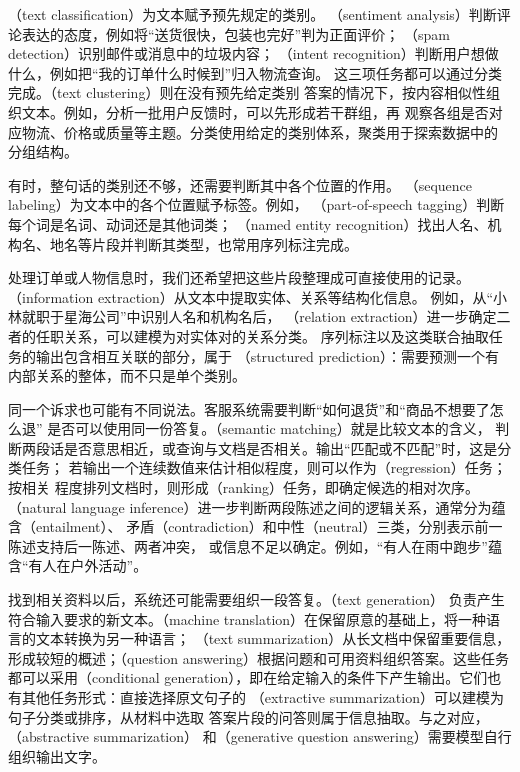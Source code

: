（text classification）为文本赋予预先规定的类别。
（sentiment analysis）判断评论表达的态度，例如将“送货很快，包装也完好”判为正面评价；
（spam detection）识别邮件或消息中的垃圾内容；
（intent recognition）判断用户想做什么，例如把“我的订单什么时候到”归入物流查询。
这三项任务都可以通过分类完成。（text clustering）则在没有预先给定类别
答案的情况下，按内容相似性组织文本。例如，分析一批用户反馈时，可以先形成若干群组，再
观察各组是否对应物流、价格或质量等主题。分类使用给定的类别体系，聚类用于探索数据中的
分组结构。

有时，整句话的类别还不够，还需要判断其中各个位置的作用。
（sequence labeling）为文本中的各个位置赋予标签。例如，
（part-of-speech tagging）判断每个词是名词、动词还是其他词类；
（named entity recognition）找出人名、机构名、地名等片段并判断其类型，也常用序列标注完成。

处理订单或人物信息时，我们还希望把这些片段整理成可直接使用的记录。
（information extraction）从文本中提取实体、关系等结构化信息。
例如，从“小林就职于星海公司”中识别人名和机构名后，
（relation extraction）进一步确定二者的任职关系，可以建模为对实体对的关系分类。
序列标注以及这类联合抽取任务的输出包含相互关联的部分，属于
（structured prediction）：需要预测一个有内部关系的整体，而不只是单个类别。

同一个诉求也可能有不同说法。客服系统需要判断“如何退货”和“商品不想要了怎么退”
是否可以使用同一份答复。（semantic matching）就是比较文本的含义，
判断两段话是否意思相近，或查询与文档是否相关。输出“匹配或不匹配”时，这是分类任务；
若输出一个连续数值来估计相似程度，则可以作为（regression）任务；按相关
程度排列文档时，则形成（ranking）任务，即确定候选的相对次序。
（natural
language inference）进一步判断两段陈述之间的逻辑关系，通常分为蕴含（entailment）、
矛盾（contradiction）和中性（neutral）三类，分别表示前一陈述支持后一陈述、两者冲突，
或信息不足以确定。例如，“有人在雨中跑步”蕴含“有人在户外活动”。

找到相关资料以后，系统还可能需要组织一段答复。（text generation）
负责产生符合输入要求的新文本。（machine
translation）在保留原意的基础上，将一种语言的文本转换为另一种语言；
（text summarization）从长文档中保留重要信息，形成较短的概述；（question
answering）根据问题和可用资料组织答案。这些任务都可以采用（conditional
generation），即在给定输入的条件下产生输出。它们也有其他任务形式：直接选择原文句子的
（extractive summarization）可以建模为句子分类或排序，从材料中选取
答案片段的问答则属于信息抽取。与之对应，（abstractive summarization）
和（generative question answering）需要模型自行组织输出文字。


